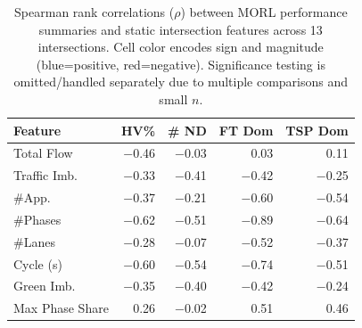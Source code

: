 
\newcommand{\heat}[1]{%
  \pgfmathsetmacro{\absrho}{abs(#1)}%
\pgfmathsetmacro{\pct}{ifthenelse(\absrho<0.45,0,min(100,30*\absrho))}%
  \ifdim #1 pt > 0pt
    \edef\heatcolor{blue!\pct!white}%
  \else
    \edef\heatcolor{red!\pct!white}%
  \fi
  \expandafter\cellcolor\expandafter{\heatcolor}\num{#1}%
}

\begin{table}
\centering
\scriptsize
\setlength{\tabcolsep}{2.5pt}
\renewcommand{\arraystretch}{1.15}
\caption{Spearman rank correlations ($\rho$) between MORL performance summaries and static intersection features across 13 intersections. Cell color encodes sign and magnitude (blue=positive, red=negative). Significance testing is omitted/handled separately due to multiple comparisons and small $n$.}
\label{tab:spearman}
\begin{tabular}{lrrrr}
\toprule
Feature & HV\% & \# ND & FT Dom & TSP Dom \\
\midrule
Total Flow & \heat{-0.46} & \heat{-0.03} & \heat{0.03} & \heat{0.11} \\
Traffic Imb. & \heat{-0.33} & \heat{-0.41} & \heat{-0.42} & \heat{-0.25} \\
\#App. & \heat{-0.37} & \heat{-0.21} & \heat{-0.60} & \heat{-0.54} \\
\#Phases & \heat{-0.62} & \heat{-0.51} & \heat{-0.89} & \heat{-0.64} \\
\#Lanes & \heat{-0.28} & \heat{-0.07} & \heat{-0.52} & \heat{-0.37} \\
Cycle (s) & \heat{-0.60} & \heat{-0.54} & \heat{-0.74} & \heat{-0.51} \\
Green Imb. & \heat{-0.35} & \heat{-0.40} & \heat{-0.42} & \heat{-0.24} \\
Max Phase Share & \heat{0.26} & \heat{-0.02} & \heat{0.51} & \heat{0.46} \\
\bottomrule
\end{tabular}
\end{table}
